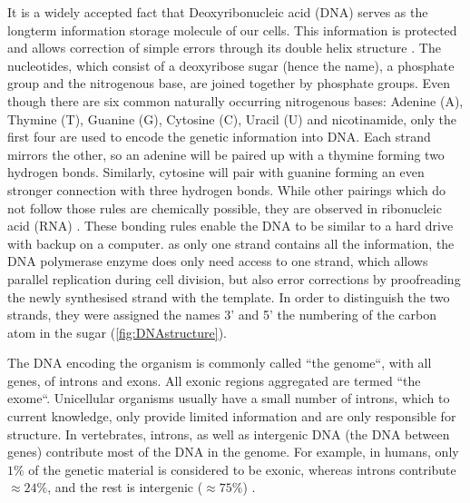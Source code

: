 It is a widely accepted fact\remove{,} that Deoxyribonucleic acid (DNA) serves as the long\add{-}term information storage molecule of our cells. This information is protected and allows  correction of simple errors through its double helix structure \cite{Watson1953,Liang1998}. The nucleotides, which consist of a deoxyribose sugar (hence the name), a phosphate group and the nitrogenous base, are joined together by phosphate groups. Even though there are six common naturally occurring nitrogenous bases: Adenine (A), Thymine (T), Guanine (G), Cytosine (C), Uracil (U) and nicotinamide, only the first four\add{,} are used to encode the genetic information into DNA. Each  strand mirrors the other, so an adenine will be paired up with a thymine forming two hydrogen bonds. Similarly, cytosine will pair with guanine forming an even stronger connection with three hydrogen bonds. While other pairings which do not follow those rules are chemically possible, they are  observed in ribonucleic acid (RNA) \cite{Sinden1994}. These  bonding rules enable the DNA to be similar to a hard drive with backup on a computer.  as only one strand contains all the information, the DNA polymerase enzyme does only need access to one strand, which allows parallel replication during cell division, but also error corrections\remove{,} by proofreading the newly synthesised strand with the template. In order  to distinguish the two strands, they were assigned the names 3' and 5'  the numbering of the  carbon atom in the sugar (\autoref{fig:DNAstructure}).

The  DNA encoding the organism is commonly called ``the genome``, with all genes,  of introns and exons. All exonic regions aggregated are termed ``the exome``. Unicellular organisms usually have a  small number of introns, which to current knowledge, only provide limited information and are only responsible for  structure. In vertebrates,  introns, as well as intergenic DNA (the DNA between genes) contribute most of the DNA in the genome. For example, in humans, only $1\%$ of the genetic material is considered to be exonic, whereas introns contribute $\approx 24\%$, and the rest is intergenic ($\approx 75\%$) \cite{Venter2001}.

